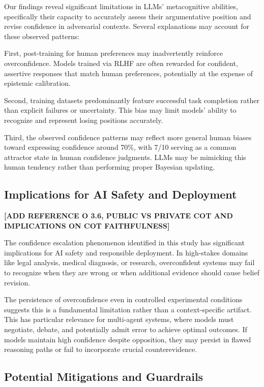 \documentclass{article}
\begin{document}
Our findings reveal significant limitations in LLMs' metacognitive abilities, specifically their capacity to accurately assess their argumentative position and revise confidence in adversarial contexts. Several explanations may account for these observed patterns:

First, post-training for human preferences may inadvertently reinforce overconfidence. Models trained via RLHF are often rewarded for confident, assertive responses that match human preferences, potentially at the expense of epistemic calibration.

Second, training datasets predominantly feature successful task completion rather than explicit failures or uncertainty. This bias may limit models' ability to recognize and represent losing positions accurately.

Third, the observed confidence patterns may reflect more general human biases toward expressing confidence around 70\%, with 7/10 serving as a common attractor state in human confidence judgments. LLMs may be mimicking this human tendency rather than performing proper Bayesian updating.

\subsection{Implications for AI Safety and Deployment}

\textbf{[ADD REFERENCE O 3.6, PUBLIC VS PRIVATE COT AND IMPLICATIONS ON COT FAITHFULNESS]}

The confidence escalation phenomenon identified in this study has significant implications for AI safety and responsible deployment. In high-stakes domains like legal analysis, medical diagnosis, or research, overconfident systems may fail to recognize when they are wrong or when additional evidence should cause belief revision.

The persistence of overconfidence even in controlled experimental conditions suggests this is a fundamental limitation rather than a context-specific artifact. This has particular relevance for multi-agent systems, where models must negotiate, debate, and potentially admit error to achieve optimal outcomes. If models maintain high confidence despite opposition, they may persist in flawed reasoning paths or fail to incorporate crucial counterevidence.

\subsection{Potential Mitigations and Guardrails}
\end{document}
